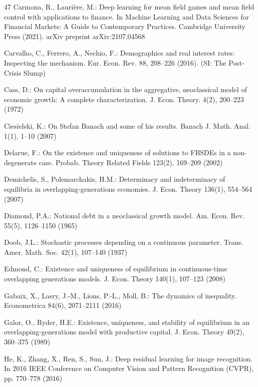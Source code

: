 \documentclass[11pt,oneside,english,reqno,dvipsnames,table]{amsart}
\numberwithin{equation}{section}
\theoremstyle{plain}
\theoremstyle{definition}
\theoremstyle{remark}
\theoremstyle{plain}
\theoremstyle{plain}
\theoremstyle{plain}
\theoremstyle{plain}
\theoremstyle{plain}
\theoremstyle{plain}
\theoremstyle{plain}
\numberwithin{thm}{section}
\begin{document}
\begin{thebibliography}{47}
Carmona, R., Laurière, M.: Deep learning for mean field games and mean field control with applications to finance. In Machine Learning and Data Sciences for Financial Markets: A Guide to Contemporary Practices. Cambridge University Press (2021). arXiv preprint arXiv:2107.04568

Carvalho, C., Ferrero, A., Nechio, F.: Demographics and real interest rates: Inspecting the mechanism. Eur. Econ. Rev. 88, 208--226 (2016). (SI: The Post-Crisis Slump)

Cass, D.: On capital overaccumulation in the aggregative, neoclassical model of economic growth: A complete characterization. J. Econ. Theory. 4(2), 200--223 (1972)

Ciesielski, K.: On Stefan Banach and some of his results. Banach J. Math. Anal. 1(1), 1--10 (2007)

Delarue, F.: On the existence and uniqueness of solutions to FBSDEs in a non-degenerate case. Probab. Theory Related Fields 123(2), 169--209 (2002)

Demichelis, S., Polemarchakis, H.M.: Determinacy and indeterminacy of equilibria in overlapping-generations economies. J. Econ. Theory 136(1), 554--564 (2007)

Diamond, P.A.: National debt in a neoclassical growth model. Am. Econ. Rev. 55(5), 1126--1150 (1965)

Doob, J.L.: Stochastic processes depending on a continuous parameter. Trans. Amer. Math. Soc. 42(1), 107--140 (1937)

Edmond, C.: Existence and uniqueness of equilibrium in continuous-time overlapping generations models. J. Econ. Theory 140(1), 107--123 (2008)

Gabaix, X., Lasry, J.-M., Lions, P.-L., Moll, B.: The dynamics of inequality. Econometrica 84(6), 2071--2111 (2016)

Galor, O., Ryder, H.E.: Existence, uniqueness, and stability of equilibrium in an overlapping-generations model with productive capital. J. Econ. Theory 49(2), 360--375 (1989)

He, K., Zhang, X., Ren, S., Sun, J.: Deep residual learning for image recognition. In 2016 IEEE Conference on Computer Vision and Pattern Recognition (CVPR), pp. 770--778 (2016)


\end{thebibliography}
\end{document}

